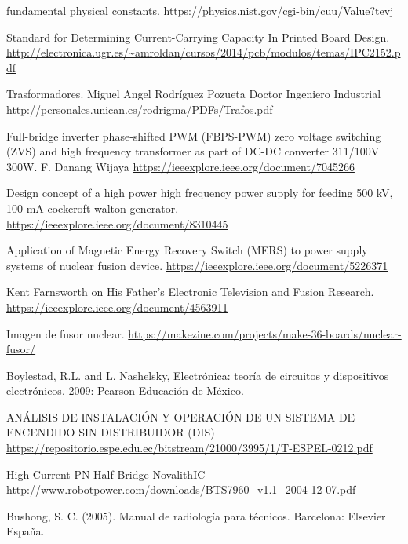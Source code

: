 \documentclass[twoside,22pt]{Latex/Classes/thesisUMSNH}
\begin{document}
\begin{thebibliography}{2}





fundamental physical constants. \url{https://physics.nist.gov/cgi-bin/cuu/Value?tevj}

Standard for Determining Current-Carrying Capacity In Printed Board Design. \url{http://electronica.ugr.es/~amroldan/cursos/2014/pcb/modulos/temas/IPC2152.pdf}

Trasformadores. Miguel Angel Rodríguez Pozueta
Doctor Ingeniero Industrial \url{http://personales.unican.es/rodrigma/PDFs/Trafos.pdf}

Full-bridge inverter phase-shifted PWM (FBPS-PWM) zero voltage switching (ZVS) and high frequency transformer as part of DC-DC converter 311/100V 300W. F. Danang Wijaya \url{https://ieeexplore.ieee.org/document/7045266}


Design concept of a high power high frequency power supply for feeding 500 kV, 100 mA cockcroft-walton generator. \url{https://ieeexplore.ieee.org/document/8310445}

Application of Magnetic Energy Recovery Switch (MERS) to power supply systems of nuclear fusion device. \url{https://ieeexplore.ieee.org/document/5226371}

Kent Farnsworth on His Father's Electronic Television and Fusion Research. \url{https://ieeexplore.ieee.org/document/4563911}

Imagen de fusor nuclear. \url{https://makezine.com/projects/make-36-boards/nuclear-fusor/}


Boylestad, R.L. and L. Nashelsky, Electrónica: teoría de circuitos y dispositivos electrónicos. 2009: Pearson Educación de México.

ANÁLISIS DE INSTALACIÓN Y OPERACIÓN DE UN
SISTEMA DE ENCENDIDO SIN DISTRIBUIDOR (DIS) \url{https://repositorio.espe.edu.ec/bitstream/21000/3995/1/T-ESPEL-0212.pdf}


High Current PN Half Bridge
NovalithIC \url{http://www.robotpower.com/downloads/BTS7960_v1.1_2004-12-07.pdf}





Bushong, S. C. (2005). Manual de radiología para técnicos. Barcelona: Elsevier España.






\end{thebibliography}
\end{document}
